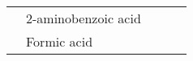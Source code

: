 {\begin{tabular}{@{}lp{5cm}p{2cm}p{2cm}p{12cm}@{}}
                                                      & 2-aminobenzoic acid                                    &                                                                                        &                                                   &                                                                                                                                                                                                                                                                                                                                                                                                                                                                                                                                                                                                                                                                                                                                                                                                                                                                                                                    \\ \cmidrule(l){2-2}
                                                      & Formic acid                                            &                                                                                        &                                                   &                                                                                                                                                                                                                                                                                                                                                                                                                                                                                                                                                                                                                                                                                                                                                                                                                                                                                                                    \\ \cmidrule(l){2-2}

\end{tabular}}
